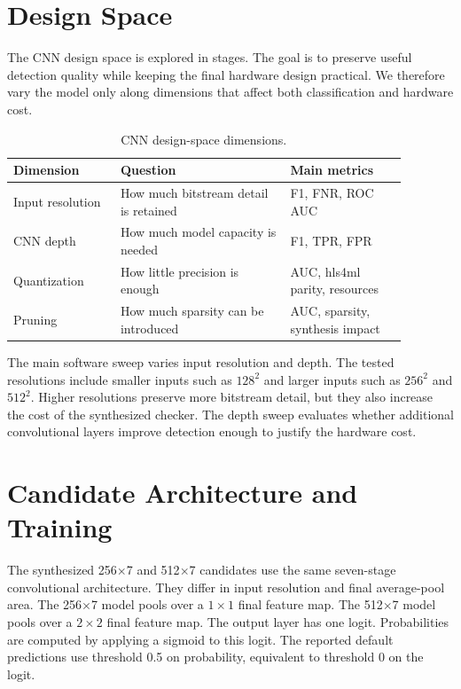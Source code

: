 \section{Design Space}
\label{sec:cnn-design-space}

The CNN design space is explored in stages. The goal is to preserve useful detection quality while keeping the final hardware design practical. We therefore vary the model only along dimensions that affect both classification and hardware cost.

\begin{table}[t]
    \centering
    \caption{CNN design-space dimensions.}
    \label{tab:cnn-design-space}
    \begin{tabular}{p{0.24\linewidth} p{0.38\linewidth} p{0.26\linewidth}}
        \toprule
        \textbf{Dimension} & \textbf{Question} & \textbf{Main metrics} \\
        \midrule
        Input resolution &
        How much bitstream detail is retained &
        F1, FNR, ROC AUC \\
        \midrule
        CNN depth &
        How much model capacity is needed &
        F1, TPR, FPR \\
        \midrule
        Quantization &
        How little precision is enough &
        AUC, hls4ml parity, resources \\
        \midrule
        Pruning &
        How much sparsity can be introduced &
        AUC, sparsity, synthesis impact \\
        \bottomrule
    \end{tabular}
\end{table}

The main software sweep varies input resolution and depth. The tested resolutions include smaller inputs such as $128^2$ and larger inputs such as $256^2$ and $512^2$. Higher resolutions preserve more bitstream detail, but they also increase the cost of the synthesized checker. The depth sweep evaluates whether additional convolutional layers improve detection enough to justify the hardware cost.

\section{Candidate Architecture and Training}
\label{sec:cnn-architecture-training}

The synthesized 256$\times$7 and 512$\times$7 candidates use the same seven-stage convolutional architecture. They differ in input resolution and final average-pool area. The 256$\times$7 model pools over a $1 \times 1$ final feature map. The 512$\times$7 model pools over a $2 \times 2$ final feature map. The output layer has one logit. Probabilities are computed by applying a sigmoid to this logit. The reported default predictions use threshold 0.5 on probability, equivalent to threshold 0 on the logit.

